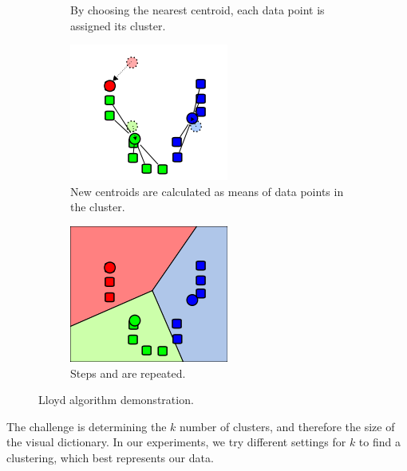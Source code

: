 \begin{figure}[ht]
\begin{subfigure}[t]{0.2\textwidth}
        \caption{By choosing the nearest centroid, each data point is assigned its cluster.}
        \label{fig:k-means-alg:assignment_step}
    \end{subfigure}\hfill
    \begin{subfigure}[t]{0.2\textwidth}
        \includegraphics[width=\textwidth]{Figures/k-means/k-means_update_step.png}
        \caption{New centroids are calculated as means of data points in the cluster.}
        \label{fig:k-means-alg:update_step}
    \end{subfigure}\hfill
    \begin{subfigure}[t]{0.2\textwidth}
        \includegraphics[width=\textwidth]{Figures/k-means/k-means_assignment_step_2.png}
        \caption{Steps  and  are repeated.}
        \label{fig:k-means-alg:assignment_step_2}
    \end{subfigure}\hfill
    \caption[Lloyd's algorithm demonstration.]{Lloyd algorithm demonstration. \cite{Wikikmeans}}
    \label{fig:k_means_alg}
\end{figure}
The challenge is determining the $k$ number of clusters, and therefore the size of the visual dictionary. In our experiments, we try different settings for $k$ to find a clustering, which best represents our data.
